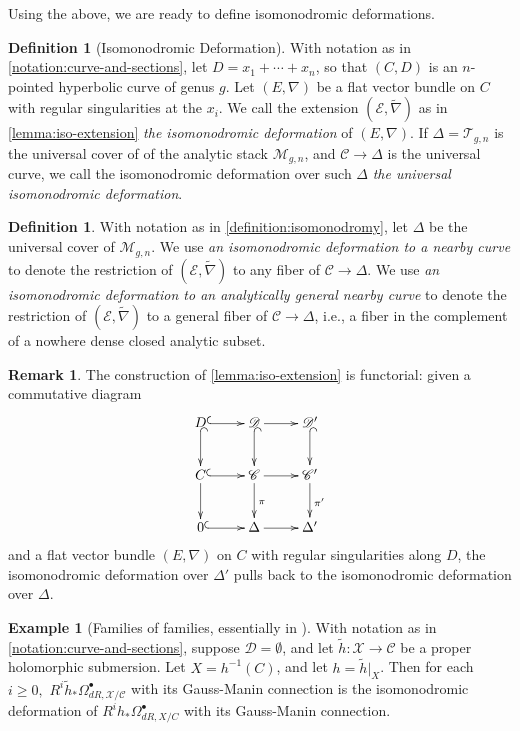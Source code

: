 \documentclass[12 pt]{amsart}
\theoremstyle{plain}
\theoremstyle{definition}
\newtheorem{definition}[subsubsection]{Definition}
\newtheorem{remark}[subsubsection]{Remark}
\newtheorem{example}[subsubsection]{Example}
\theoremstyle{remark}
\numberwithin{equation}{section}
\begin{document}
Using the above, we are ready to define isomonodromic deformations.
\begin{definition}[Isomonodromic Deformation]
	\label{definition:isomonodromy}
	With notation as in \autoref{notation:curve-and-sections}, let $D=x_1+ \cdots+ x_n$, so that $(C, D)$ is an $n$-pointed hyperbolic curve of genus $g$. Let $(E, \nabla)$ be a flat vector bundle on $C$ with regular singularities at the $x_i$.
We call the extension $(\mathscr{E}, \widetilde{\nabla})$ as in
\autoref{lemma:iso-extension} \emph{the isomonodromic deformation} of $({E}, \nabla)$.
If $\Delta=\mathscr{T}_{g,n}$ is the universal cover of
of the analytic stack $\mathscr{M}_{g,n}$, and $\mathscr{C}\to \Delta$ is the universal curve,
we call the isomonodromic deformation over such $\Delta$  \emph{the universal
isomonodromic deformation}.
\end{definition}
\begin{definition}
	\label{definition:nearby}
	With notation as in \autoref{definition:isomonodromy}, let $\Delta$ be
	the universal cover of $\mathscr{M}_{g,n}$.
We use \emph{an isomonodromic deformation to a nearby curve} to denote the
restriction of $(\mathscr{E}, \widetilde{\nabla})$ to any fiber of $\mathscr{C}
\to \Delta$.
We use 
\emph{an isomonodromic deformation to an analytically general nearby curve}
to denote the restriction of $(\mathscr{E}, \widetilde{\nabla})$ to a
general fiber of $\mathscr{C}
\to \Delta$, i.e., a fiber in the complement of a nowhere dense closed analytic
subset.
\end{definition}

\begin{remark}
	\label{remark:}
	The construction of \autoref{lemma:iso-extension} is functorial: given a commutative diagram 
$$\xymatrix{
D \ar@{^(->}[d] \ar@{^(->}[r] & \mathscr{D} \ar[r]\ar@{^(->}[d] & \mathscr{D}'\ar@{^(->}[d] \\
C \ar@{^(->}[r] \ar[d]& \mathscr{C} \ar[r] \ar[d]^\pi & \mathscr{C}' \ar[d]^{\pi'}\\
0 \ar@{^(->}[r] & \Delta \ar[r] & \Delta'
}$$
and a flat vector bundle $({E}, \nabla)$ on $C$ with regular
singularities along $D$, the isomonodromic deformation over $\Delta'$ pulls back
to the isomonodromic deformation over $\Delta$.
\end{remark}
\begin{example}[Families of families, essentially in \cite{doran:isomonodromic}]
	With notation as in \autoref{notation:curve-and-sections}, suppose $\mathscr{D}=\emptyset$, and let $\tilde h:
\mathscr{X}\to \mathscr{C}$ be a proper holomorphic submersion. Let
$X=h^{-1}(C)$, and let $h=\tilde h|_X$. Then for each $i\geq 0,$ $R^i\tilde
h_*\Omega^\bullet_{dR, \mathscr{X}/\mathscr{C}}$ with its Gauss-Manin connection
is the isomonodromic deformation of $R^ih_*\Omega^\bullet_{dR, X/C}$ with its
Gauss-Manin connection.
\end{example}
\end{document}
